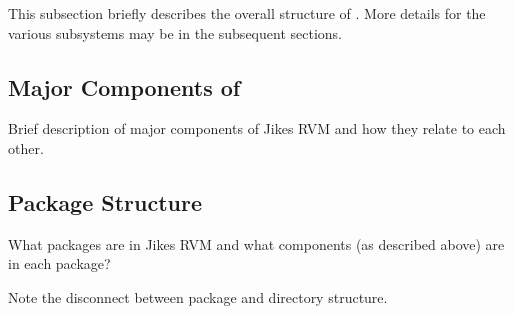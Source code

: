 This subsection briefly describes the overall structure of \jrvm.
More details for the various subsystems may be in the subsequent
sections. 

\subsection{Major Components of \jrvm}
Brief description of major components of Jikes RVM and how they relate
to each other.

\subsection{Package Structure}
What packages are in Jikes RVM and what components (as described
above) are in each package?

Note the disconnect between package and directory structure.





